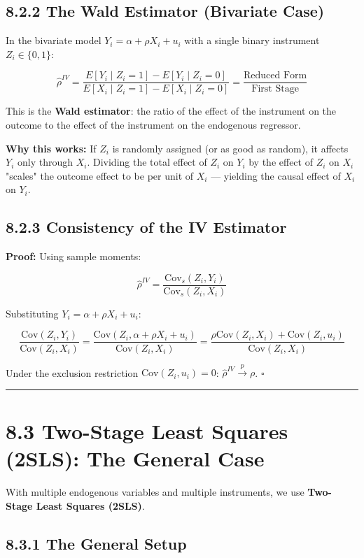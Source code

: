 \subsection{8.2.2 The Wald Estimator (Bivariate Case)}

In the bivariate model $Y_i = \alpha + \rho X_i + u_i$ with a single binary instrument $Z_i \in \{0,1\}$:

\[
\hat{\rho}^{IV} = \frac{E[Y_i \mid Z_i = 1] - E[Y_i \mid Z_i = 0]}{E[X_i \mid Z_i = 1] - E[X_i \mid Z_i = 0]} = \frac{\text{Reduced Form}}{\text{First Stage}}
\]

This is the \textbf{Wald estimator}: the ratio of the effect of the instrument on the outcome to the effect of the instrument on the endogenous regressor.

\textbf{Why this works:} If $Z_i$ is randomly assigned (or as good as random), it affects $Y_i$ only through $X_i$. Dividing the total effect of $Z_i$ on $Y_i$ by the effect of $Z_i$ on $X_i$ "scales" the outcome effect to be per unit of $X_i$ --- yielding the causal effect of $X_i$ on $Y_i$.

\subsection{8.2.3 Consistency of the IV Estimator}

\textbf{Proof:} Using sample moments:

\[
\hat{\rho}^{IV} = \frac{\text{Cov}_s(Z_i, Y_i)}{\text{Cov}_s(Z_i, X_i)}
\]

Substituting $Y_i = \alpha + \rho X_i + u_i$:

\[
\frac{\text{Cov}(Z_i, Y_i)}{\text{Cov}(Z_i, X_i)} = \frac{\text{Cov}(Z_i, \alpha + \rho X_i + u_i)}{\text{Cov}(Z_i, X_i)} = \frac{\rho \text{Cov}(Z_i, X_i) + \text{Cov}(Z_i, u_i)}{\text{Cov}(Z_i, X_i)}
\]

Under the exclusion restriction $\text{Cov}(Z_i, u_i) = 0$: $\hat{\rho}^{IV} \xrightarrow{p} \rho$. $\square$

\medskip\hrule\medskip

\section{8.3 Two-Stage Least Squares (2SLS): The General Case}

With multiple endogenous variables and multiple instruments, we use \textbf{Two-Stage Least Squares (2SLS)}.

\subsection{8.3.1 The General Setup}

